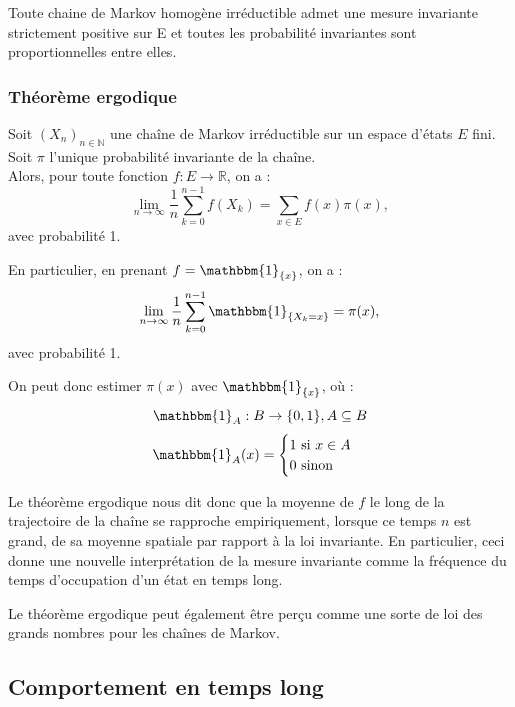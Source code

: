 \documentclass{article}
\begin{document}
\begin{tcolorbox}[colback=white,colframe=blue!80!black,title=Probabilité invariante d'une chaîne de Markov irréductible]
Toute chaine de Markov homogène irréductible admet une mesure invariante strictement positive sur E et toutes les probabilité invariantes sont proportionnelles entre elles.
\end{tcolorbox}

\newpage
\subsubsection{Théorème ergodique}

\begin{tcolorbox}[colback=white,colframe=red!80!black,title=Théorème ergodique (admis)]

Soit $(X_n)_{n \in \mathbb{N}}$ une chaîne de Markov irréductible sur un espace d'états $E$ fini. Soit $\pi$ l'unique probabilité invariante de la chaîne. \\

Alors, pour toute fonction $f : E \to \mathbb{R}$, on a :
\[
\lim_{n \to \infty} \frac{1}{n} \sum_{k=0}^{n-1} f(X_k) = \sum_{x \in E} f(x)\pi(x),
\]
avec probabilité 1.

En particulier, en prenant $f = \mathbbm{1}_{\{x\}}$, on a :
\[
\lim_{n \to \infty} \frac{1}{n} \sum_{k=0}^{n-1} \mathbbm{1}_{\{X_k = x\}} = \pi(x),
\]
avec probabilité 1.

\end{tcolorbox}

On peut donc estimer $\pi(x)$ avec $\mathbbm{1}_{\{x\}} $, où :
\[
    \mathbbm{1}_{A} : B \to \{0,1\}, A \subseteq B
\]
\[
    \mathbbm{1}_{A}(x) = \begin{cases}
        1 \text{ si } x \in A \\
        0 \text{ sinon} 
    \end{cases}
\]

Le théorème ergodique nous dit donc que la moyenne de $f$ le long de la trajectoire de la chaîne se rapproche empiriquement,
lorsque ce temps $n$ est grand, de sa moyenne spatiale par rapport à la loi invariante. En particulier, 
ceci donne une nouvelle interprétation de la mesure invariante comme la fréquence du temps d'occupation d'un état en temps long.

Le théorème ergodique peut également être perçu comme une sorte de loi des grands nombres pour les chaînes de Markov.

\newpage %
\subsection{Comportement en temps long}
\end{document}
